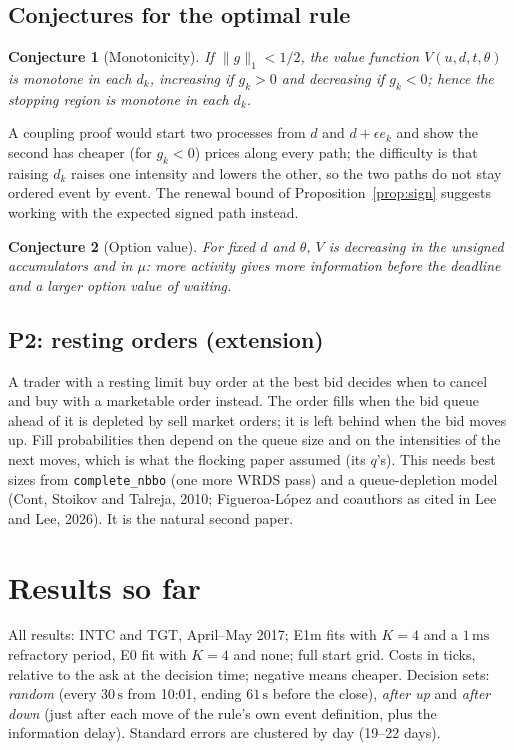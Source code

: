 \documentclass[11pt]{article}
\newtheorem{conjecture}{Conjecture}
\theoremstyle{definition}
\theoremstyle{remark}
\newcommand{\Eo}{\textsf{E0}}
\newcommand{\Em}{\textsf{E1m}}
\newcommand{\ms}{\,\text{ms}}
\newcommand{\sx}{\,\text{s}}
\newcommand{\file}[1]{\texttt{#1}}
\begin{document}
\subsection{Conjectures for the optimal rule}

\begin{conjecture}[Monotonicity]
If $\|g\|_1 < 1/2$, the value function $V(u, d, t, \theta)$ is monotone in each $d_k$, increasing if $g_k > 0$ and decreasing if $g_k < 0$; hence the stopping region is monotone in each $d_k$.
\end{conjecture}
A coupling proof would start two processes from $d$ and $d + \epsilon e_k$ and show the second has cheaper (for $g_k < 0$) prices along every path; the difficulty is that raising $d_k$ raises one intensity and lowers the other, so the two paths do not stay ordered event by event. The renewal bound of Proposition~\ref{prop:sign} suggests working with the expected signed path instead.

\begin{conjecture}[Option value]
For fixed $d$ and $\theta$, $V$ is decreasing in the unsigned accumulators and in $\mu$: more activity gives more information before the deadline and a larger option value of waiting.
\end{conjecture}

\subsection{P2: resting orders (extension)}
\label{sec:resting}

A trader with a resting limit buy order at the best bid decides when to cancel and buy with a marketable order instead. The order fills when the bid queue ahead of it is depleted by sell market orders; it is left behind when the bid moves up. Fill probabilities then depend on the queue size and on the intensities of the next moves, which is what the flocking paper assumed (its $q$'s). This needs best sizes from \file{complete\_nbbo} (one more WRDS pass) and a queue-depletion model (Cont, Stoikov and Talreja, 2010; Figueroa-L\'opez and coauthors as cited in Lee and Lee, 2026). It is the natural second paper.

\section{Results so far}
\label{sec:results}

All results: INTC and TGT, April--May 2017; \Em{} fits with $K = 4$ and a $1\ms$ refractory period, \Eo{} fit with $K = 4$ and none; full start grid. Costs in ticks, relative to the ask at the decision time; negative means cheaper. Decision sets: \emph{random} (every $30\sx$ from 10:01, ending $61\sx$ before the close), \emph{after up} and \emph{after down} (just after each move of the rule's own event definition, plus the information delay). Standard errors are clustered by day (19--22 days).
\end{document}
